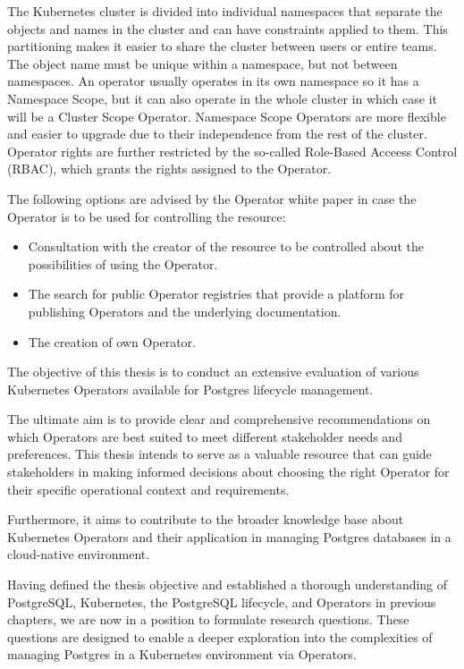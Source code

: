 The Kubernetes cluster is divided into individual namespaces that separate the objects and names in the cluster and can have constraints applied to them. This partitioning makes it easier to share the cluster between users or entire teams. The object name must be unique within a namespace, but not between namespaces.  An operator usually operates in its own namespace so it has a Namespace Scope, but it can also operate in the whole cluster in which case it will be a Cluster Scope Operator. Namespace Scope Operators are more flexible and easier to upgrade due to their independence from the rest of the cluster. Operator rights are further restricted by the so-called Role-Based Acceess Control (RBAC), which grants the rights assigned to the Operator. \cite{ OperatorsAtK8sIface}

The following options are advised by the Operator white paper \cite{OperatorWhitepaper} in case the Operator is to be used for controlling the resource:
\begin{itemize}
    \item	Consultation with the creator of the resource to be controlled about the possibilities of using the Operator.
    \item	The search for public Operator registries that provide a platform for publishing Operators and the underlying documentation.
    \item	The creation of own Operator.
\end{itemize}

The objective of this thesis is to conduct an extensive evaluation of various Kubernetes Operators available for Postgres lifecycle management.

The ultimate aim is to provide clear and comprehensive recommendations on which Operators are best suited to meet different stakeholder needs and preferences. This thesis intends to serve as a valuable resource that can guide stakeholders in making informed decisions about choosing the right Operator for their specific operational context and requirements.

Furthermore, it aims to contribute to the broader knowledge base about Kubernetes Operators and their application in managing Postgres databases in a cloud-native environment.


Having defined the thesis objective and established a thorough understanding of PostgreSQL, Kubernetes, the PostgreSQL lifecycle, and Operators in previous chapters, we are now in a position to formulate research questions.
These questions are designed to enable a deeper exploration into the complexities of managing Postgres in a Kubernetes environment via Operators.

